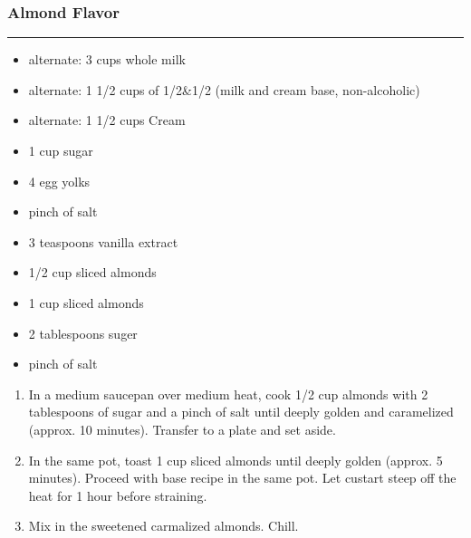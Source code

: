\documentclass{article}
\begin{document}
\subsubsection{Almond Flavor}
\noindent\rule[0.5ex]{\linewidth}{0.5pt}
\begin{framed}
    \begin{itemize}
        \item alternate: 3 cups whole milk
        \item alternate: 1 1/2 cups of 1/2\&1/2 (milk and cream base, non-alcoholic)
        \item alternate: 1 1/2 cups Cream
        \item 1 cup sugar
        \item 4 egg yolks
        \item pinch of salt
        \item 3 teaspoons vanilla extract
        \item 1/2 cup sliced almonds
        \item 1 cup sliced almonds
        \item 2 tablespoons suger
        \item pinch of salt
    \end{itemize}
\end{framed}
\begin{enumerate}
    \item 
        In a medium saucepan over medium heat, cook 1/2 cup almonds with 2 tablespoons of sugar and a pinch of salt until deeply golden and caramelized (approx. 10 minutes). Transfer to a plate and set aside.
    \item 
        In the same pot, toast 1 cup sliced almonds until deeply golden (approx. 5 minutes). Proceed with base recipe in the same pot. Let custart steep off the heat for 1 hour before straining. 
    \item 
        Mix in the sweetened carmalized almonds. Chill.

\end{enumerate}
\end{document}

